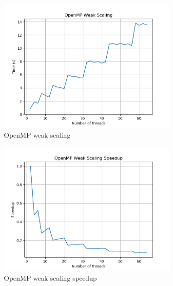 \begin{figure}[h!]
    \centering
    \includegraphics[width=0.8\textwidth]{../images/omp_weak_scaling.png}
    \caption{OpenMP weak scaling}
    \label{fig:openmp_weak_scaling}
\end{figure}

\begin{figure}[h!]
    \centering
    \includegraphics[width=0.8\textwidth]{../images/omp_weak_scaling_speedup.png}
    \caption{OpenMP weak scaling speedup}
    \label{fig:openmp_weak_scaling_speedup}
\end{figure}



